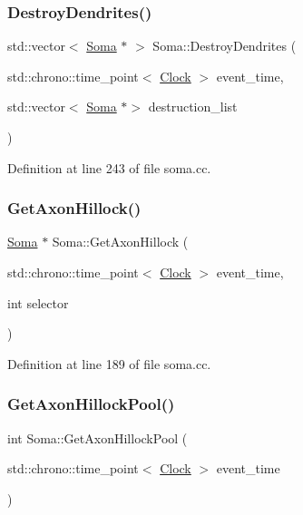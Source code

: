 \subsubsection{\texorpdfstring{Destroy\+Dendrites()}{DestroyDendrites()}}
{\footnotesize\ttfamily std\+::vector$<$ \mbox{\hyperlink{class_soma}{Soma}} $\ast$ $>$ Soma\+::\+Destroy\+Dendrites (\begin{DoxyParamCaption}\item[{std\+::chrono\+::time\+\_\+point$<$ \mbox{\hyperlink{universe_8h_a0ef8d951d1ca5ab3cfaf7ab4c7a6fd80}{Clock}} $>$}]{event\+\_\+time,  }\item[{std\+::vector$<$ \mbox{\hyperlink{class_soma}{Soma}} $\ast$$>$}]{destruction\+\_\+list }\end{DoxyParamCaption})}



Definition at line 243 of file soma.\+cc.

\mbox{\label{class_soma_ac8756f68dbaac8c70cfba435f7068a85}} 
\subsubsection{\texorpdfstring{Get\+Axon\+Hillock()}{GetAxonHillock()}}
{\footnotesize\ttfamily \mbox{\hyperlink{class_soma}{Soma}} $\ast$ Soma\+::\+Get\+Axon\+Hillock (\begin{DoxyParamCaption}\item[{std\+::chrono\+::time\+\_\+point$<$ \mbox{\hyperlink{universe_8h_a0ef8d951d1ca5ab3cfaf7ab4c7a6fd80}{Clock}} $>$}]{event\+\_\+time,  }\item[{int}]{selector }\end{DoxyParamCaption})}



Definition at line 189 of file soma.\+cc.

\mbox{\label{class_soma_a23dc309849522d9f857fdcc71ea85877}} 
\subsubsection{\texorpdfstring{Get\+Axon\+Hillock\+Pool()}{GetAxonHillockPool()}}
{\footnotesize\ttfamily int Soma\+::\+Get\+Axon\+Hillock\+Pool (\begin{DoxyParamCaption}\item[{std\+::chrono\+::time\+\_\+point$<$ \mbox{\hyperlink{universe_8h_a0ef8d951d1ca5ab3cfaf7ab4c7a6fd80}{Clock}} $>$}]{event\+\_\+time }\end{DoxyParamCaption})\hspace{0.3cm}{\ttfamily [inline]}}




